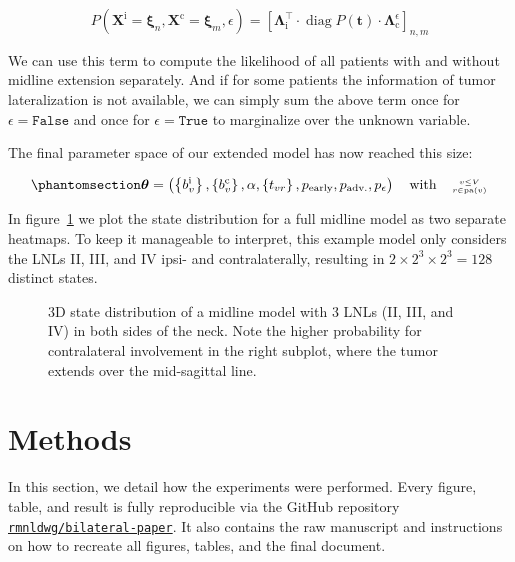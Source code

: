 \documentclass[
  sn-mathphys-num,
]{sn-jnl}
\begin{document}
\[
P \left( \mathbf{X}^\text{i} = \boldsymbol{\xi}_n, \mathbf{X}^\text{c} = \boldsymbol{\xi}_m, \epsilon \right) = \left[ \boldsymbol{\Lambda}^\intercal_\text{i} \cdot \operatorname{diag} P(\mathbf{t}) \cdot \boldsymbol{\Lambda}_\text{c}^\epsilon \right]_{n,m}
\]

We can use this term to compute the likelihood of all patients with and
without midline extension separately. And if for some patients the
information of tumor lateralization is not available, we can simply sum
the above term once for \(\epsilon=\texttt{False}\) and once for
\(\epsilon=\texttt{True}\) to marginalize over the unknown variable.

The final parameter space of our extended model has now reached this
size:

\begin{equation}\phantomsection\label{eq-ext-param-space}{
\boldsymbol{\theta} = \left( \left\{ b_v^\text{i} \right\}, \left\{ b_v^\text{c} \right\}, \alpha, \left\{ t_{vr} \right\}, p_\text{early}, p_\text{adv.}, p_\epsilon \right) \quad \text{with} \quad \genfrac{}{}{0pt}{2}{v\leq V}{r\in\operatorname{pa}(v)}
}\end{equation}

In figure~\ref{fig-model-state-dist} we plot the state distribution for
a full midline model as two separate heatmaps. To keep it manageable to
interpret, this example model only considers the LNLs II, III, and IV
ipsi- and contralaterally, resulting in
\(2 \times 2^3 \times 2^3 = 128\) distinct states.

\begin{figure}


\caption{\label{fig-model-state-dist}3D state distribution of a midline
model with 3 LNLs (II, III, and IV) in both sides of the neck. Note the
higher probability for contralateral involvement in the right subplot,
where the tumor extends over the mid-sagittal line.}

\end{figure}%

\section{Methods}\label{sec-methods}

In this section, we detail how the experiments were performed. Every
figure, table, and result is fully reproducible via the GitHub
repository
\href{https://github.com/rmnldwg/bilateral-paper}{\texttt{rmnldwg/bilateral-paper}}.
It also contains the raw manuscript and instructions on how to recreate
all figures, tables, and the final document.
\end{document}

